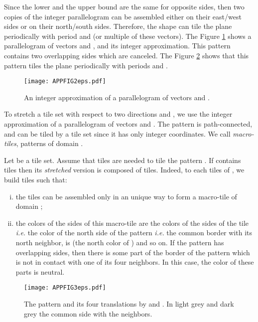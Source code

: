 \documentclass{llncs}
\makeatletter
\newcommand{\ie}{\emph{i.e.}\@\xspace}
\makeatother
\begin{document}
 Since the lower and the
upper bound are the same for opposite sides, then two copies of the integer parallelogram  can be
assembled either on their east/west sides or on their north/south sides. Therefore, the shape  can
tile the plane periodically with period  and  (or multiple of these vectors).
The Figure \ref{FIGAPP2} shows a parallelogram of vectors  and , and its
integer approximation. This pattern contains two overlapping sides which are canceled. The Figure \ref{FIGAPP3}
shows that this pattern tiles the plane periodically with periods  and .

\begin{figure}
\begin{center}
\texttt{[image: APPFIG2eps.pdf]}
\end{center}
\caption{An integer approximation of a parallelogram of vectors  and .}
\label{FIGAPP2}
\end{figure}

To stretch a tile set with respect to two directions  and , we use the integer approximation 
of a parallelogram of vectors  and . The pattern  is path-connected, and can be tiled by
a tile set since it has only integer coordinates. We call {\em macro-tiles}, patterns of domain  .

Let  be a tile set. Assume that  tiles are needed to tile the pattern
. If  contains  tiles then its {\em stretched} version 
is composed of  tiles. Indeed, to each tiles  of , we build  tiles such that:

\begin{enumerate}[i)]
\item the  tiles can be assembled only in an unique way to form a macro-tile of domain ;
\item the colors of the sides of this macro-tile are the colors of the sides of the tile \ie the color
of the north side of the pattern \ie the common border with its north neighbor,
is  (the north color of ) and so on. If the pattern has overlapping sides, then there is some part of the border of the pattern
which is not in contact with one of its four neighbors. In this case, the color of these parts is neutral.

\end{enumerate}


\begin{figure}
\begin{center}
\texttt{[image: APPFIG3eps.pdf]}
\end{center}
\caption{The pattern  and its four translations by  and . In light grey and dark grey the common side with the neighbors.}
\label{FIGAPP3}
\end{figure}
\end{document}

